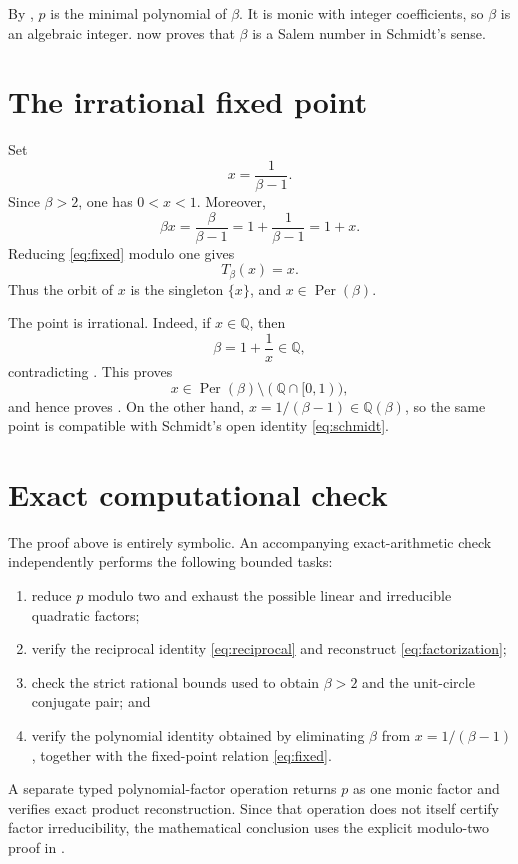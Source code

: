 \documentclass[10pt,reqno]{amsart}
\theoremstyle{definition}
\newcommand{\Q}{\mathbb Q}
\newcommand{\Per}{\operatorname{Per}}
\begin{document}
By , \(p\) is the minimal polynomial of \(\beta\).
It is monic with integer coefficients, so \(\beta\) is an algebraic integer.
 now proves that \(\beta\) is a Salem number in Schmidt's
sense.

\section{The irrational fixed point}

Set
\[
 x=\frac1{\beta-1}.
\]
Since \(\beta>2\), one has \(0<x<1\).  Moreover,
\begin{equation}\label{eq:fixed}
 \beta x=\frac{\beta}{\beta-1}
 =1+\frac1{\beta-1}=1+x.
\end{equation}
Reducing \eqref{eq:fixed} modulo one gives
\[
 T_\beta(x)=x.
\]
Thus the orbit of \(x\) is the singleton \(\{x\}\), and
\(x\in\Per(\beta)\).

The point is irrational.  Indeed, if \(x\in\Q\), then
\[
 \beta=1+\frac1x\in\Q,
\]
contradicting .  This proves
\[
 x\in\Per(\beta)\setminus(\Q\cap[0,1)),
\]
and hence proves .  On the other hand,
\(x=1/(\beta-1)\in\Q(\beta)\), so the same point is compatible with
Schmidt's open identity \eqref{eq:schmidt}.

\section{Exact computational check}

The proof above is entirely symbolic.  An accompanying exact-arithmetic
check independently performs the following bounded tasks:

\begin{enumerate}
\item reduce \(p\) modulo two and exhaust the possible linear and irreducible
  quadratic factors;
\item verify the reciprocal identity \eqref{eq:reciprocal} and reconstruct
  \eqref{eq:factorization};
\item check the strict rational bounds used to obtain \(\beta>2\) and the
  unit-circle conjugate pair; and
\item verify the polynomial identity obtained by eliminating \(\beta\) from
  \(x=1/(\beta-1)\), together with the fixed-point relation
  \eqref{eq:fixed}.
\end{enumerate}

A separate typed polynomial-factor operation returns \(p\) as one monic
factor and verifies exact product reconstruction.  Since that operation does
not itself certify factor irreducibility, the mathematical conclusion uses
the explicit modulo-two proof in .
\end{document}
